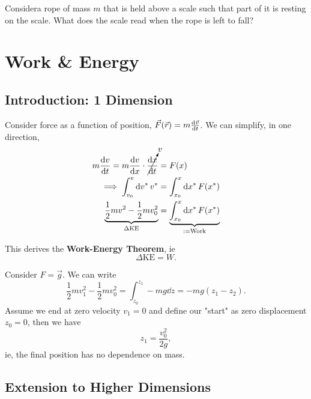 \documentclass[12pt]{article}
\begin{document}
\begin{example}
  Consider\footnotemark a rope of mass $m$ that is held above a scale such that part of it is resting on the scale. What does the scale read when the rope is left to fall?\\
\end{example}

\section{Work \& Energy}

\subsection{Introduction: 1 Dimension}

Consider force as a function of position, $\vec{F}(\vec{r}) = m \dv{\vec{v}}{t}$. We can simplify, in one direction, \begin{align*}
  m \dv{v}{t} = m \dv{v}{x}\cdot\cancelto{v}{\dv{x}{t}} &= F(x)\\
  \implies \int_{v_0}^v \dd{v^*} v^* &= \int_{x_0}^x \dd{x^*} F(x^*)\\
  \underbrace{\frac{1}{2}mv^2 - \frac{1}{2}mv_0^2}_{\Delta \text{KE}} &= \underbrace{\int_{x_0}^x \dd{x^*} F(x^*)}_{:=\text{Work}}
\end{align*}

This derives the \textbf{Work-Energy Theorem}, ie \[\Delta \text{KE} = W.\]

\begin{example}
  Consider $F = \vec{g}$. We can write \[\frac{1}{2}m v_1^2 - \frac{1}{2}m v_0^2 = \int_{z_0}^{z_1} - mg \dd{z} = -mg(z_1- z_2).\] Assume we end at zero velocity $v_1 = 0$ and define our "start" as zero displacement $z_0 = 0$, then we have \[z_1 = \frac{v_0^2}{2g},\] ie, the final position has no dependence on mass.
\end{example}

\subsection{Extension to Higher Dimensions}
\end{document}

